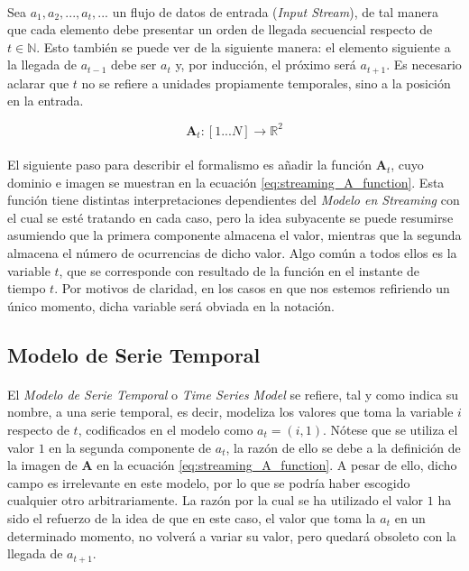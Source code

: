 \documentclass{subfiles}
\begin{document}
        \paragraph{}
        Sea $a_1 ,a_2 ,... ,a_t,... $ un flujo de datos de entrada (\emph{Input Stream}), de tal manera que cada elemento debe presentar un orden de llegada secuencial respecto de $t \in \mathbb{N}$. Esto también se puede ver de la siguiente manera: el elemento siguiente a la llegada de $a_{t-1}$ debe ser $a_{t}$ y, por inducción, el próximo será $a_{t+1}$. Es necesario aclarar que $t$ no se refiere a unidades propiamente temporales, sino a la posición en la entrada.


        \begin{equation}
        \label{eq:streaming_A_function}
          \boldsymbol{A}_t:[1...N] \rightarrow \mathbb{R}^2
        \end{equation}


        \paragraph{}
        El siguiente paso para describir el formalismo es añadir la función $\boldsymbol{A}_t$, cuyo dominio e imagen se muestran en la ecuación \eqref{eq:streaming_A_function}. Esta función tiene distintas interpretaciones dependientes del \emph{Modelo en Streaming} con el cual se esté tratando en cada caso, pero la idea subyacente se puede resumirse asumiendo que la primera componente almacena el valor, mientras que la segunda almacena el número de ocurrencias de dicho valor. Algo común a todos ellos es la variable $t$, que se corresponde con resultado de la función en el instante de tiempo $t$. Por motivos de claridad, en los casos en que nos estemos refiriendo un único momento, dicha variable será obviada en la notación.

      \subsection{Modelo de Serie Temporal}
      \label{sec:streaming_time_series}

        \paragraph{}
        El \emph{Modelo de Serie Temporal} o \emph{Time Series Model} se refiere, tal y como indica su nombre, a una serie temporal, es decir, modeliza los valores que toma la variable $i$ respecto de $t$, codificados en el modelo como $a_t = (i,1)$. Nótese que se utiliza el valor $1$ en la segunda componente de $a_t$, la razón de ello se debe a la definición de la imagen de $\boldsymbol{A}$ en la ecuación \eqref{eq:streaming_A_function}. A pesar de ello, dicho campo es irrelevante en este modelo, por lo que se podría haber escogido cualquier otro arbitrariamente. La razón por la cual se ha utilizado el valor $1$ ha sido el refuerzo de la idea de que en este caso, el valor que toma la $a_t$ en un determinado momento, no volverá a variar su valor, pero quedará obsoleto con la llegada de $a_{t+1}$.
\end{document}
